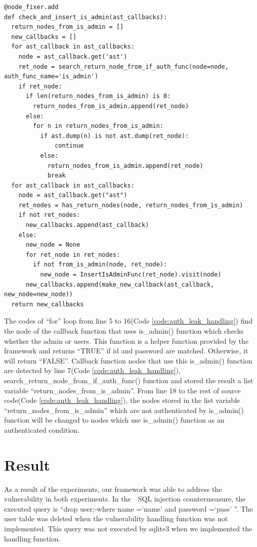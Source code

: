 \documentclass[conference]{IEEEtran}
\begin{document}
\begin{lstlisting}[caption={A vulnerable function which address an authentication leak.}, label=code:auth_leak_handling, captionpos=b]
@node_fixer.add
def check_and_insert_is_admin(ast_callbacks):
  return_nodes_from_is_admin = []
  new_callbacks = []
  for ast_callback in ast_callbacks:
    node = ast_callback.get('ast')
    ret_node = search_return_node_from_if_auth_func(node=node, auth_func_name='is_admin')
    if ret_node:
      if len(return_nodes_from_is_admin) is 0:
        return_nodes_from_is_admin.append(ret_node)
      else:
        for n in return_nodes_from_is_admin:
          if ast.dump(n) is not ast.dump(ret_node):
              continue
          else:
            return_nodes_from_is_admin.append(ret_node)
            break
  for ast_callback in ast_callbacks:
    node = ast_callback.get("ast")
    ret_nodes = has_return_nodes(node, return_nodes_from_is_admin)
    if not ret_nodes:
      new_callbacks.append(ast_callback)
    else:
      new_node = None
      for ret_node in ret_nodes:
        if not from_is_admin(node, ret_node):
          new_node = InsertIsAdminFunc(ret_node).visit(node)
      new_callbacks.append(make_new_callback(ast_callback, new_node=new_node))
  return new_callbacks
\end{lstlisting}
The codes of “for” loop from line 5 to 16(Code \ref{code:auth_leak_handling}) find the node of the callback function that uses is\_admin() function which checks whether the admin or users.
This function is a helper function provided by the framework and returns “TRUE” if id and password are matched. Otherwise, it will return “FALSE”.
Callback function nodes that use this is\_admin() function are detected by line 7(Code \ref{code:auth_leak_handling}), search\_return\_node\_from\_if\_auth\_func() function and stored the result a list variable “return\_nodes\_from\_is\_admin”.
From line 18 to the rest of source code(Code \ref{code:auth_leak_handling}), the nodes stored in the list variable “return\_nodes\_from\_is\_admin” which are not authenticated by is\_admin() function will be changed to nodes which use is\_admin() function as an authenticated condition.


\section{Result}
As a result of the experiments, our framework was able to address the vulnerability in both experiments.
In the　SQL injection countermeasure, the executed query is ``drop user;-where name =`name' and password =`pass' ''.
The user table was deleted when the vulnerability handling function was not implemented.
This query was not executed by sqlite3 when we implemented the handling function.
\end{document}
